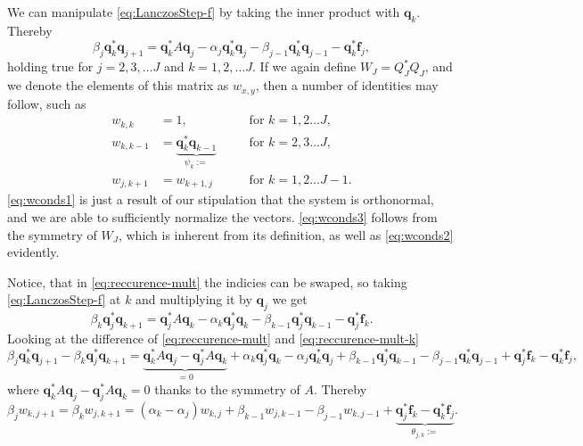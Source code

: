 \documentclass{article}
\begin{document}
	We can manipulate \autoref{eq:LanczosStep-f} by taking the inner product with $\textbf{q}_k$. Thereby
	\begin{equation}\label{eq:reccurence-mult}
		\beta_j\mathbf{q}_k^*\mathbf{q}_{j+1}=\mathbf{q}_k^*A\mathbf{q}_j-\alpha_j\mathbf{q}_k^*\mathbf{q}_j-\beta_{j-1}\mathbf{q}_k^*\mathbf{q}_{j-1} - \mathbf{q}_k^*\textbf{f}_j,
	\end{equation}
	holding true for $j=2,3,\dots J$ and $k=1,2, \dots J$. If we again define $W_J = Q_J^\ast Q_J$, and we denote the elements of this matrix as $w_{x,y}$, then a number of identities may follow, such as 
	\begin{align}
		w_{k,k} &=  1, \quad&&\mathrm{for}\,\, k = 1,2 \dots J\label{eq:wconds1}, \\
		w_{k,k-1} &= \underbrace{\textbf{q}_k^\ast \textbf{q}_{k-1}}_{\psi_k := } \quad&&\mathrm{for}\,\, k = 2,3 \dots J\label{eq:wconds2}, \\
		w_{j,k+1} &=  w_{k+1, j}\quad&&\mathrm{for}\,\, k = 1,2 \dots J-1\label{eq:wconds3}.
	\end{align}
	\autoref{eq:wconds1} is just a result of our stipulation that the system is orthonormal, and we are able to sufficiently normalize the vectors. \autoref{eq:wconds3} follows from the symmetry of $W_{J}$, which is inherent from its definition, as well as \autoref{eq:wconds2} evidently.
	
	Notice, that in \autoref{eq:reccurence-mult} the indicies can be swaped, so taking \autoref{eq:LanczosStep-f} at $k$ and multiplying it by $\textbf{q}_{j}$ we get
	\begin{equation}\label{eq:reccurence-mult-k}
		\beta_k\mathbf{q}_j^*\mathbf{q}_{k+1}=\mathbf{q}_j^*A\mathbf{q}_k-\alpha_k\mathbf{q}_j^*\mathbf{q}_k-\beta_{k-1}\mathbf{q}_j^*\mathbf{q}_{k-1} - \mathbf{q}_j^*\textbf{f}_k.
	\end{equation}
	Looking at the difference of \autoref{eq:reccurence-mult} and \autoref{eq:reccurence-mult-k}
	\begin{equation}
		\beta_j\mathbf{q}_k^*\mathbf{q}_{j+1} - \beta_k\mathbf{q}_j^*\mathbf{q}_{k+1}=\underbrace{\mathbf{q}_k^*A\mathbf{q}_j - \mathbf{q}_j^*A\mathbf{q}_k}_{=0} +
		\alpha_k\mathbf{q}_j^*\mathbf{q}_k - \alpha_j\mathbf{q}_k^*\mathbf{q}_j + \beta_{k-1}\mathbf{q}_j^*\mathbf{q}_{k-1} - \beta_{j-1}\mathbf{q}_k^*\mathbf{q}_{j-1} + \mathbf{q}_j^*\textbf{f}_k  - \mathbf{q}_k^*\textbf{f}_j,
	\end{equation}
	where $\mathbf{q}_k^*A\mathbf{q}_j - \mathbf{q}_j^*A\mathbf{q}_k = 0$ thanks to the symmetry of $A$. Thereby
	\begin{equation}
		\beta_j w_{k,j+1} = \beta_k w_{j,k+1} = \left(\alpha_k - \alpha_j\right) w_{k,j} + \beta_{k-1} w_{j, k-1} - \beta_{j-1} w_{k,j-1} + \underbrace{\mathbf{q}_j^*\textbf{f}_k-\mathbf{q}_k^*\textbf{f}_j}_{\theta_{j,k} 
		:=}.
	\end{equation}
	 
\end{document}
